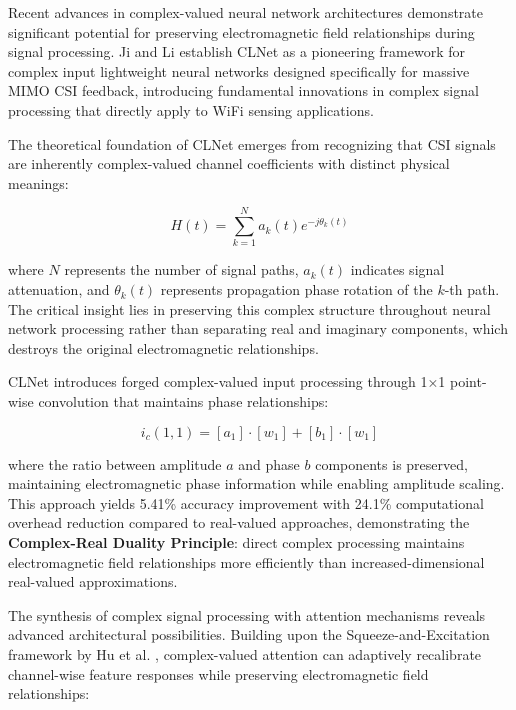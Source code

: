 \documentclass[journal]{IEEEtran}
\begin{document}
Recent advances in complex-valued neural network architectures demonstrate significant potential for preserving electromagnetic field relationships during signal processing. Ji and Li \cite{ji2021clnet} establish CLNet as a pioneering framework for complex input lightweight neural networks designed specifically for massive MIMO CSI feedback, introducing fundamental innovations in complex signal processing that directly apply to WiFi sensing applications.

The theoretical foundation of CLNet emerges from recognizing that CSI signals are inherently complex-valued channel coefficients with distinct physical meanings:

\begin{equation}
H(t) = \sum_{k=1}^{N} a_k(t)e^{-j\theta_k(t)}
\label{eq:clnet_csi_complex}
\end{equation}

where $N$ represents the number of signal paths, $a_k(t)$ indicates signal attenuation, and $\theta_k(t)$ represents propagation phase rotation of the $k$-th path. The critical insight lies in preserving this complex structure throughout neural network processing rather than separating real and imaginary components, which destroys the original electromagnetic relationships.

CLNet introduces forged complex-valued input processing through 1×1 point-wise convolution that maintains phase relationships:

\begin{equation}
i_c(1,1) = [a_1] \cdot [w_1] + [b_1] \cdot [w_1]
\label{eq:clnet_pointwise}
\end{equation}

where the ratio between amplitude $a$ and phase $b$ components is preserved, maintaining electromagnetic phase information while enabling amplitude scaling. This approach yields 5.41\% accuracy improvement with 24.1\% computational overhead reduction compared to real-valued approaches, demonstrating the \textbf{Complex-Real Duality Principle}: direct complex processing maintains electromagnetic field relationships more efficiently than increased-dimensional real-valued approximations.

The synthesis of complex signal processing with attention mechanisms reveals advanced architectural possibilities. Building upon the Squeeze-and-Excitation framework by Hu et al. \cite{hu2018squeeze}, complex-valued attention can adaptively recalibrate channel-wise feature responses while preserving electromagnetic field relationships:
\end{document}
